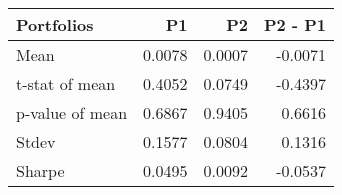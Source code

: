 \begin{tabular}{lrrr}
\toprule
Portfolios & P1 & P2 & P2 - P1 \\
\midrule
Mean & 0.0078 & 0.0007 & -0.0071 \\
t-stat of mean & 0.4052 & 0.0749 & -0.4397 \\
p-value of mean & 0.6867 & 0.9405 & 0.6616 \\
Stdev & 0.1577 & 0.0804 & 0.1316 \\
Sharpe & 0.0495 & 0.0092 & -0.0537 \\
\bottomrule
\end{tabular}
